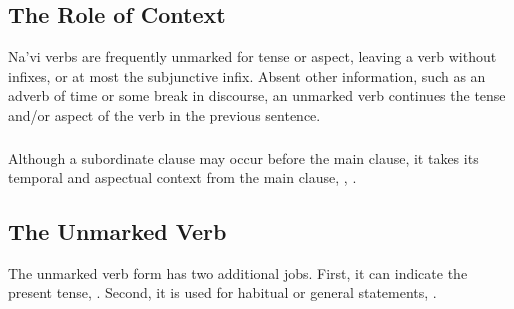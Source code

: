 \subsection{The Role of Context} Na'vi verbs are frequently unmarked
for tense or aspect, leaving a verb without infixes, or at most the
subjunctive infix.  Absent other information, such as an adverb of
time or some break in discourse, an unmarked verb continues the tense
and/or aspect of the verb in the previous sentence.

\subsubsection{} Although a subordinate clause may occur before the
main clause, it takes its temporal and aspectual context from the main
clause,  ,  .

\subsection{The Unmarked Verb} The unmarked verb form has two
additional jobs.  First, it can indicate the present tense,
 .  Second, it is used for
habitual or general statements, 
  .

